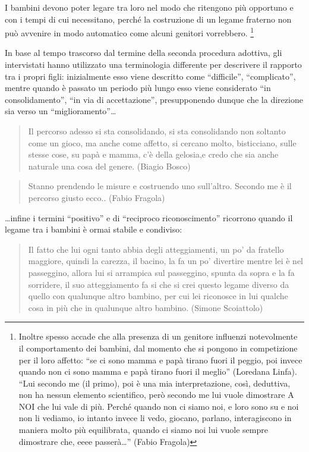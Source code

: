 \documentclass[12pt,oneside,svgnames]{memoir}
\newenvironment{quotationb}%
{\color{maincolor}\begin{leftbar}\begin{quotation}}%
{\end{quotation}\end{leftbar}\ignorespacesafterend}
\begin{document}
I bambini devono poter legare tra loro nel modo che ritengono più
opportuno e con i tempi di cui necessitano, perché la costruzione di un
legame fraterno non può avvenire in modo automatico come alcuni genitori
vorrebbero. \footnote{Inoltre spesso accade che alla presenza di un
  genitore influenzi notevolmente il comportamento dei bambini, dal
  momento che si pongono in competizione per il loro affetto: ``se ci
  sono mamma e papà tirano fuori il peggio, poi invece quando non ci
  sono mamma e papà tirano fuori il meglio'' (Loredana Linfa). ``Lui
  secondo me (il primo), poi è una mia interpretazione, così, deduttiva,
  non ha nessun elemento scientifico, però secondo me lui vuole
  dimostrare A NOI che lui vale di più. Perché quando non ci siamo noi,
  e loro sono su e noi non li vediamo, io intanto invece li vedo,
  giocano, parlano, interagiscono in maniera molto più equilibrata,
  quando ci siamo noi lui vuole sempre dimostrare che, eeee
  passerà\ldots{}'' (Fabio Fragola)}

In base al tempo trascorso dal termine della seconda procedura adottiva,
gli intervistati hanno utilizzato una terminologia differente per
descrivere il rapporto tra i propri figli: inizialmente esso viene
descritto come ``difficile'', ``complicato'', mentre quando è passato un
periodo più lungo esso viene considerato ``in consolidamento'', ``in via
di accettazione'', presupponendo dunque che la direzione sia verso un
``miglioramento''\ldots{}

\begin{quotationb}
Il percorso adesso si sta consolidando, si sta consolidando non soltanto
come un gioco, ma anche come affetto, si cercano molto, bisticciano,
sulle stesse cose, su papà e mamma, c'è della gelosia,e credo che sia
anche naturale una cosa del genere. (Biagio Bosco)
\end{quotationb}

\begin{quotationb}
Stanno prendendo le misure e costruendo uno sull'altro. Secondo me è il
percorso giusto ecco.. (Fabio Fragola)
\end{quotationb}

\ldots{}infine i termini ``positivo'' e di ``reciproco riconoscimento''
ricorrono quando il legame tra i bambini è ormai stabile e condiviso:

\begin{quotationb}
Il fatto che lui ogni tanto abbia degli atteggiamenti, un po' da
fratello maggiore, quindi la carezza, il bacino, la fa un po' divertire
mentre lei è nel passeggino, allora lui si arrampica sul passeggino,
spunta da sopra e la fa sorridere, il suo atteggiamento fa si che si
crei questo legame diverso da quello con qualunque altro bambino, per
cui lei riconosce in lui qualche cosa in più che in qualunque altro
bambino. (Simone Scoiattolo)
\end{quotationb}
\end{document}
